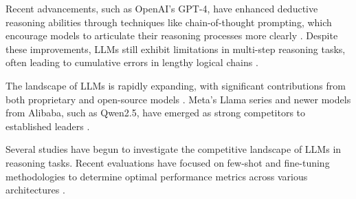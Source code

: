 \documentclass[conference]{IEEEtran}
\begin{document}
Recent advancements, such as OpenAI's GPT-4, have enhanced deductive reasoning abilities through techniques like chain-of-thought prompting, which encourage models to articulate their reasoning processes more clearly \cite{gou2024rationality}. Despite these improvements, LLMs still exhibit limitations in multi-step reasoning tasks, often leading to cumulative errors in lengthy logical chains \cite{tong2024can}.

The landscape of LLMs is rapidly expanding, with significant contributions from both proprietary and open-source models \cite{he2023survey}. Meta's Llama series and newer models from Alibaba, such as Qwen2.5, have emerged as strong competitors to established leaders \cite{hui2024qwen2, yang2024qwen2}. 



Several studies have begun to investigate the competitive landscape of LLMs in reasoning tasks. Recent evaluations have focused on few-shot and fine-tuning methodologies to determine optimal performance metrics across various architectures \cite{winata2021language, huang2024automating}. %
\end{document}
